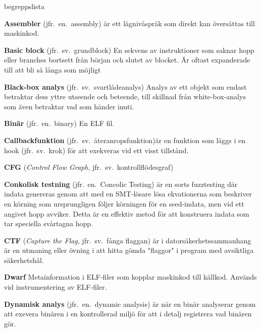 \begin{labeling}{begreppslista}

    \item [\textbf{Assembler}] (jfr.\ en.\ assembly) är ett
    lågnivåspråk som direkt kan översättas till maskinkod.

    \item[\textbf{Basic block}] (jfr.\ sv.\ grundblock) En sekvens av
    instruktioner som saknar hopp eller branches bortsett från
    början och slutet av blocket. Är oftast expanderade till att
    bli så långa som möjligt

    \item [\textbf{Black-box analys}] (jfr.\ sv.\ svartlådeanalys)
    Analys av ett objekt som endast betraktar dess yttre utseende
    och beteende, till skillnad från white-box-analys som även
    betraktar vad som händer inuti.

    \item [\textbf{Binär}] (jfr.\ en.\ binary) En ELF fil.

    \item [\textbf{Callbackfunktion}] (jfr.\ sv.\ återanropsfunktion)är en funktion
    som läggs i en hook (jfr.\ sv.\ krok) för att exekveras vid
    ett visst tillstånd.

    \item [\textbf{CFG}] (\emph{Control Flow Graph},
          jfr.\ sv.\ kontrollflödesgraf)

    \item [\textbf{Conkolisk testning}] (jfr.\ en.\ Concolic Testing)
    är en sorts fuzztesting där indata genereras genom att med en
    SMT-lösare lösa ekvationerna som beskriver en körning som
    ursprungligen följer körningen för en seed-indata, men vid ett
    angivet hopp avviker. Detta är en effektiv metod för att
    konstruera indata som tar speciella svårtagna hopp.

    \item [\textbf{CTF}] (\emph{Capture the Flag}, jfr.\ sv.\ fånga
          flaggan) är i datorsäkerhetssammanhang är en utmaning eller
    övning i att hitta gömda "flaggor" i program med avsiktliga
    säkerhetshål.

    \item [\textbf{Dwarf}] Metainformation i ELF-filer som kopplar
    maskinkod till källkod. Används vid instrumentering av
    ELF-filer.

    \item [\textbf{Dynamisk analys}] (jfr.\ en.\ dynamic analysis) är
    när en binär analyserar genom att exevera binären i en
    kontrollerad miljö för att i detalj registrera vad binären
    gör.


\end{labeling}
